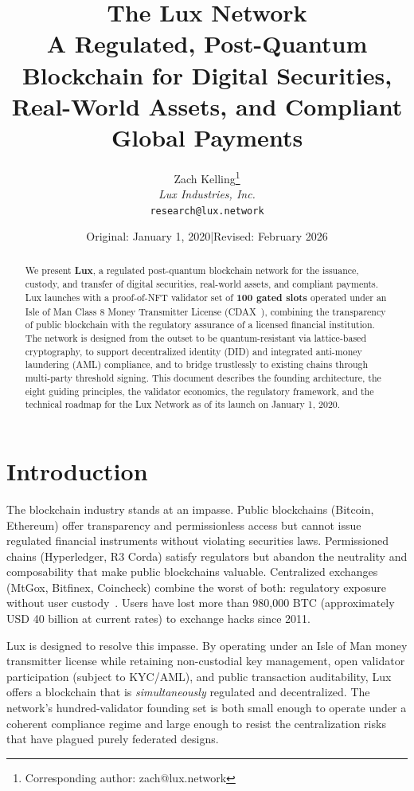 \documentclass[11pt,a4paper]{article}
\title{The Lux Network\\[6pt]
\large A Regulated, Post-Quantum Blockchain for Digital Securities,\\
Real-World Assets, and Compliant Global Payments}
\author{
Zach Kelling\thanks{Corresponding author: zach@lux.network}\\
\textit{Lux Industries, Inc.}\\
\texttt{research@lux.network}
}
\date{Original: January 1, 2020\quad|\quad Revised: February 2026}
\begin{document}
\luxcoverpage

\begin{abstract}
We present \textbf{Lux}, a regulated post-quantum blockchain network
for the issuance, custody, and transfer of digital securities,
real-world assets, and compliant payments. Lux launches with a
proof-of-NFT validator set of \textbf{100 gated slots} operated under
an Isle of Man Class 8 Money Transmitter License (CDAX~\cite{cdax}),
combining the transparency of public blockchain with the regulatory
assurance of a licensed financial institution. The network is designed
from the outset to be quantum-resistant via lattice-based cryptography,
to support decentralized identity (DID) and integrated anti-money
laundering (AML) compliance, and to bridge trustlessly to existing
chains through multi-party threshold signing. This document describes
the founding architecture, the eight guiding principles, the validator
economics, the regulatory framework, and the technical roadmap for the
Lux Network as of its launch on January 1, 2020.
\end{abstract}

\tableofcontents
\newpage

\section{Introduction}

The blockchain industry stands at an impasse. Public blockchains
(Bitcoin, Ethereum) offer transparency and permissionless access but
cannot issue regulated financial instruments without violating
securities laws. Permissioned chains (Hyperledger, R3 Corda) satisfy
regulators but abandon the neutrality and composability that make
public blockchains valuable. Centralized exchanges (MtGox, Bitfinex,
Coincheck) combine the worst of both: regulatory exposure without
user custody~\cite{hacks}. Users have lost more than 980{,}000 BTC
(approximately USD 40 billion at current rates) to exchange hacks
since 2011.

Lux is designed to resolve this impasse. By operating under an
Isle of Man money transmitter license while retaining non-custodial
key management, open validator participation (subject to KYC/AML),
and public transaction auditability, Lux offers a blockchain that is
\emph{simultaneously} regulated and decentralized. The network's
hundred-validator founding set is both small enough to operate under
a coherent compliance regime and large enough to resist the
centralization risks that have plagued purely federated designs.
\end{document}
